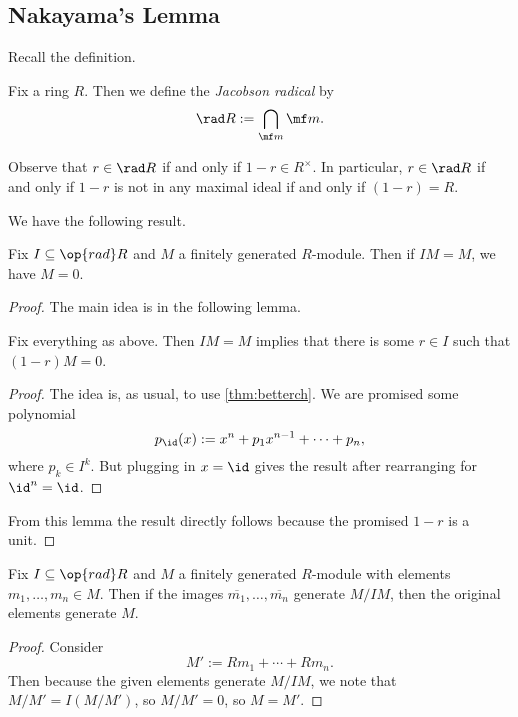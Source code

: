 \subsection{Nakayama's Lemma}
Recall the definition.
\begin{definition}
	Fix a ring $R$. Then we define the \textit{Jacobson radical} by
	\[\rad R:=\bigcap_{\mf m}\mf m.\]
\end{definition}
Observe that $r\in\rad R$ if and only if $1-r\in R^\times$. In particular, $r\in\rad R$ if and only if $1-r$ is not in any maximal ideal if and only if $(1-r)=R$.

We have the following result.
\begin{theorem}
	Fix $I\subseteq\op{rad}R$ and $M$ a finitely generated $R$-module. Then if $IM=M$, we have $M=0$.
\end{theorem}
\begin{proof}
	The main idea is in the following lemma.
	\begin{lemma}
		Fix everything as above. Then $IM=M$ implies that there is some $r\in I$ such that $(1-r)M=0$.
	\end{lemma}
	\begin{proof}
		The idea is, as usual, to use \autoref{thm:betterch}. We are promised some polynomial
		\[p_{\id}(x):=x^n+p_1x^{n-1}+\cdots+p_n,\]
		where $p_k\in I^k$. But plugging in $x=\id$ gives the result after rearranging for $\id^n=\id$.
	\end{proof}
	From this lemma the result directly follows because the promised $1-r$ is a unit.
\end{proof}
\begin{corollary}
	Fix $I\subseteq\op{rad}R$ and $M$ a finitely generated $R$-module with elements $m_1,\ldots,m_n\in M$. Then if the images $\overline{m_1},\ldots,\overline{m_n}$ generate $M/IM$, then the original elements generate $M$.
\end{corollary}
\begin{proof}
	Consider
	\[M':=Rm_1+\cdots+Rm_n.\]
	Then because the given elements generate $M/IM$, we note that $M/M'=I(M/M')$, so $M/M'=0$, so $M=M'$.
\end{proof}

